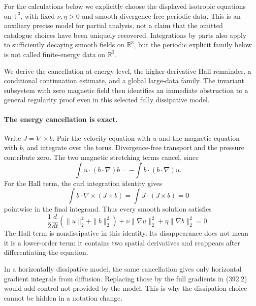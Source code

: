 \documentclass[11pt]{article}
\begin{document}
For the calculations below we explicitly choose the displayed
isotropic equations on $\mathbb T^3$, with fixed $\nu,\eta>0$
and smooth divergence-free periodic data. This is an auxiliary
precise model for partial analysis, not a claim that the omitted
catalogue choices have been uniquely recovered. Integrations by
parts also apply to sufficiently decaying smooth fields on
$\mathbb R^3$, but the periodic explicit family below is not
called finite-energy data on $\mathbb R^3$.

We derive the cancellation at energy level, the higher-derivative
Hall remainder, a conditional continuation estimate, and a global
large-data family. The invariant subsystem with zero magnetic field
then identifies an immediate obstruction to a general regularity
proof even in this selected fully dissipative model.

\paragraph{The energy cancellation is exact.}
Write $J=\nabla\times b$. Pair the velocity equation with $u$
and the magnetic equation with $b$, and integrate over the torus.
Divergence-free transport and the pressure contribute zero. The
two magnetic stretching terms cancel, since
\[
 \int u\cdot(b\cdot\nabla)b
       =-\int b\cdot(b\cdot\nabla)u.
\]
For the Hall term, the curl integration identity gives
\[
 \int b\cdot\nabla\times(J\times b)
       =\int J\cdot(J\times b)=0
 \tag{392.1}
\]
pointwise in the final integrand. Thus every smooth solution satisfies
\[
 \frac12\frac{d}{dt}(\|u\|_2^2+\|b\|_2^2)
       +\nu\|\nabla u\|_2^2+\eta\|\nabla b\|_2^2=0.
 \tag{392.2}
\]
The Hall term is nondissipative in this identity. Its disappearance
does not mean it is a lower-order term: it contains two spatial
derivatives and reappears after differentiating the equation.

In a horizontally dissipative model, the same cancellation gives
only horizontal gradient integrals from diffusion. Replacing those
by the full gradients in (392.2) would add control not provided
by the model. This is why the dissipation choice cannot be hidden
in a notation change.
\end{document}
